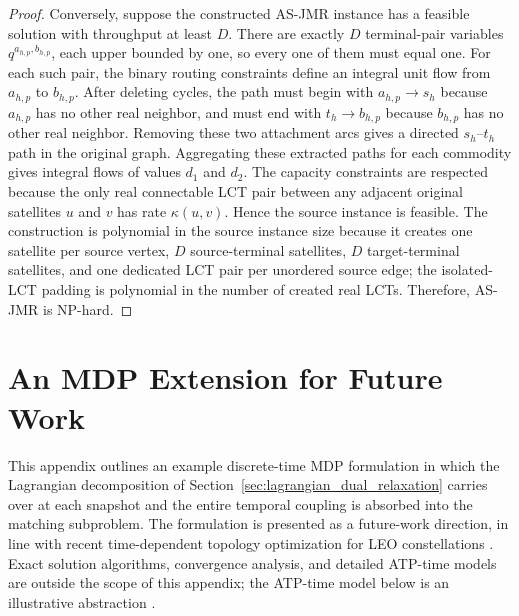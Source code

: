 \documentclass[journal]{IEEEtran}
\begin{document}
\begin{proof}
Conversely, suppose the constructed AS-JMR instance has a feasible solution with throughput at least $D$. There are exactly $D$ terminal-pair variables $q^{a_{h,p},b_{h,p}}$, each upper bounded by one, so every one of them must equal one. For each such pair, the binary routing constraints define an integral unit flow from $a_{h,p}$ to $b_{h,p}$. After deleting cycles, the path must begin with $a_{h,p}\to s_h$ because $a_{h,p}$ has no other real neighbor, and must end with $t_h\to b_{h,p}$ because $b_{h,p}$ has no other real neighbor. Removing these two attachment arcs gives a directed $s_h$--$t_h$ path in the original graph. Aggregating these extracted paths for each commodity gives integral flows of values $d_1$ and $d_2$. The capacity constraints are respected because the only real connectable LCT pair between any adjacent original satellites $u$ and $v$ has rate $\kappa(u,v)$. Hence the source instance is feasible. The construction is polynomial in the source instance size because it creates one satellite per source vertex, $D$ source-terminal satellites, $D$ target-terminal satellites, and one dedicated LCT pair per unordered source edge; the isolated-LCT padding is polynomial in the number of created real LCTs. Therefore, AS-JMR is NP-hard.
\end{proof}

\section{An MDP Extension for Future Work}\label{appendix:mdp_extension}
This appendix outlines an example discrete-time MDP formulation in which the Lagrangian decomposition of Section~\ref{sec:lagrangian_dual_relaxation} carries over at each snapshot and the entire temporal coupling is absorbed into the matching subproblem. The formulation is presented as a future-work direction, in line with recent time-dependent topology optimization for LEO constellations \cite{ron2025time}. Exact solution algorithms, convergence analysis, and detailed ATP-time models are outside the scope of this appendix; the ATP-time model below is an illustrative abstraction \cite{kaymak2018survey,li2011analytical,scheinfeild2000acquisition,bashir2021adaptive}.
\end{document}
